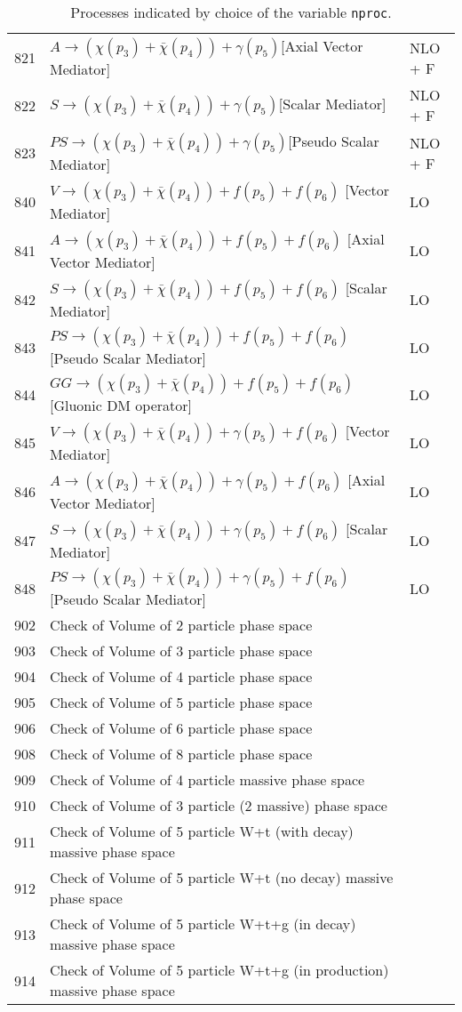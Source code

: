 \begin{table}
\begin{center}
\begin{tabular}{|l|l|l|}
821 & $A\to({\chi}(p_3)+\bar{\chi}(p_4)) +\gamma(p_5) $[Axial Vector Mediator] & NLO + F \\
822 & $ S\to({\chi}(p_3)+\bar{\chi}(p_4)) +\gamma(p_5) $[Scalar Mediator] & NLO + F \\
823 &$ PS\to({\chi}(p_3)+\bar{\chi}(p_4)) +\gamma(p_5) $[Pseudo Scalar Mediator] & NLO + F \\
\hline
840 &$ V\to({\chi}(p_3)+\bar{\chi}(p_4)) +f(p_5)+f(p_6)$ [Vector Mediator] & LO\\
841 &$A\to({\chi}(p_3)+\bar{\chi}(p_4)) +f(p_5)+f(p_6)$ [Axial Vector Mediator]  & LO\\
842 &$ S\to({\chi}(p_3)+\bar{\chi}(p_4)) +f(p_5)+f(p_6)$ [Scalar Mediator]  & LO\\
843 &$ PS\to({\chi}(p_3)+\bar{\chi}(p_4)) +f(p_5)+f(p_6)$ [Pseudo Scalar Mediator]  & LO\\
844 &$ GG\to({\chi}(p_3)+\bar{\chi}(p_4)) +f(p_5)+f(p_6)$ [Gluonic DM operator]  & LO\\
\hline
845 & $V\to({\chi}(p_3)+\bar{\chi}(p_4)) +\gamma(p_5)+f(p_6)$ [Vector Mediator]  & LO\\
846 & $A\to({\chi}(p_3)+\bar{\chi}(p_4)) +\gamma(p_5)+f(p_6)$ [Axial Vector Mediator]  & LO\\
847 & $S\to({\chi}(p_3)+\bar{\chi}(p_4)) +\gamma(p_5)+f(p_6)$ [Scalar Mediator]  & LO\\
848 & $PS\to({\chi}(p_3)+\bar{\chi}(p_4)) +\gamma(p_5)+f(p_6)$ [Pseudo Scalar Mediator]  & LO\\
\hline
902 & Check of Volume of 2 particle phase space & \\  
903 & Check of Volume of 3 particle phase space & \\  
904 & Check of Volume of 4 particle phase space & \\  
905 & Check of Volume of 5 particle phase space & \\  
906 & Check of Volume of 6 particle phase space & \\  
908 & Check of Volume of 8 particle phase space & \\  
909 & Check of Volume of 4 particle massive phase space & \\  
910 & Check of Volume of 3 particle (2 massive) phase space & \\  
911 & Check of Volume of 5 particle W+t (with decay) massive phase space & \\  
912 & Check of Volume of 5 particle W+t (no decay) massive phase space & \\  
913 & Check of Volume of 5 particle W+t+g (in decay) massive phase space & \\  
914 & Check of Volume of 5 particle W+t+g (in production) massive phase space & \\  
\hline
\end{tabular}
\caption{Processes indicated by choice of the variable {\tt nproc}.\label{nproctable}}
\end{center}
\end{table}
